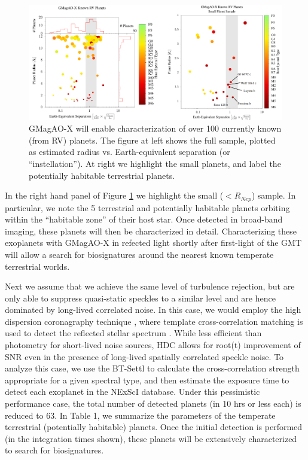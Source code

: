 \documentclass[12pt,preprint]{aastex}
\begin{document}
\begin{figure}[h!]
\centering
\includegraphics[width=6in]{figures/fig3.png}
\caption{GMagAO-X will enable characterization of over 100 currently known (from RV) planets.  The figure at left shows the full sample, plotted as estimated radius vs. Earth-equivalent separation (or “instellation”).  At right we highlight the small planets, and label the potentially habitable terrestrial planets. \label{fig:planets}}
\vspace{-0.3in}
\end{figure}

In the right hand panel of Figure \ref{fig:planets} we highlight the small ($< R_{Nep}$) sample.  In particular, we note the 5 terrestrial and potentially habitable planets orbiting within the “habitable zone” of their host star.  Once detected in broad-band imaging, these planets will then be characterized in detail.  Characterizing these exoplanets with GMagAO-X in refected light shortly after first-light of the GMT will allow a search for biosignatures around the nearest known temperate terrestrial worlds.
   
Next we assume that we achieve the same level of turbulence rejection, but are only able to suppress quasi-static speckles to a similar level and are hence dominated by long-lived correlated noise.  In this case, we would employ the high dispersion coronagraphy technique \citep[HDC,][]{2017ApJ...838...92M}, where template cross-correlation matching is used to detect the reflected stellar spectrum \citep{2017A&A...599A..16L}.  While less efficient than photometry for short-lived noise sources, HDC allows for root(t) improvement of SNR even in the presence of long-lived spatially correlated speckle noise.  To analyze this case, we use the BT-Settl \citep{2014IAUS..299..271A} to calculate the cross-correlation strength appropriate for a given spectral type, and then estimate the exposure time to detect each exoplanet in the NExScI database. Under this pessimistic performance case, the total number of detected planets (in 10 hrs or less each) is reduced to 63.
In Table 1, we summarize the parameters of the temperate terrestrial (potentially habitable) planets.  Once the initial detection is performed (in the integration times shown), these planets will be extensively characterized to search for biosignatures.
\end{document}
